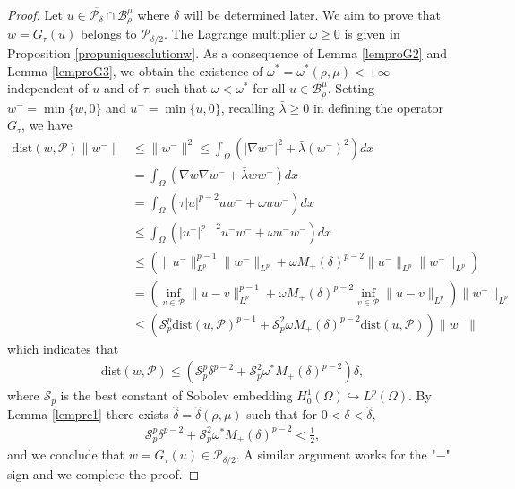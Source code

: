\documentclass[10pt,a4paper]{article}
\theoremstyle{definition} \theoremstyle{remark}
\numberwithin{equation}{section}
\newcommand{\B}{\mathcal{B}}
\newcommand{\p}{\mathcal{P}}
\newcommand{\la}{\lambda}
\begin{document}
\begin{proof}
	Let $u \in \overline{\p_\delta} \cap \B_\rho^\mu$ where $\delta$ will be determined later. We aim to prove that $w = G_\tau(u)$ belongs to $\p_{\delta/2}$. The Lagrange multiplier $\omega \geq 0$ is given in Proposition \ref{propuniquesolutionw}. As a consequence of Lemma \ref{lemproG2} and Lemma \ref{lemproG3}, we obtain the existence of $\omega^* = \omega^*(\rho,\mu) < +\infty$ independent of $u$ and of $\tau$, such that $\omega < \omega^*$ for all $u \in \B_\rho^\mu$. Setting $w^- = \min\{w,0\}$ and $u^- = \min\{u,0\}$, recalling $\bar\la \geq 0$ in defining the operator $G_\tau$, we have
	\begin{align*}
		\text{dist}(w,\p)\|w^-\| & \leq \|w^-\|^2 \le \int_\Omega\left( |\nabla w^-|^2 + \bar\la(w^-)^2\right) dx \\
		& = \int_\Omega \left( \nabla w \nabla w^- + \bar \la ww^-\right) dx \\
		& = \int_\Omega \left( \tau|u|^{p-2}u w^- + \omega u w^-\right) dx \\
		& \leq \int_\Omega \left( |u^-|^{p-2}u^- w^- + \omega u^- w^-\right) dx \\
		& \leq \left( \|u^-\|_{L^p}^{p-1}\|w^-\|_{L^p} + \omega M_+(\delta)^{p-2}\|u^-\|_{L^p}\|w^-\|_{L^p}\right) \\
		& = \left( \inf_{v \in \p}\|u-v\|_{L^p}^{p-1} + \omega M_+(\delta)^{p-2}\inf_{v \in \p}\|u-v\|_{L^p} \right) \|w^-\|_{L^p} \\
		& \le \left( \mathcal{S}_p^p \text{dist}(u,\p)^{p-1} + \mathcal{S}_p^2\omega M_+(\delta)^{p-2}\text{dist}(u,\p) \right) \|w^-\|
	\end{align*}
    which indicates that
    \begin{align} \label{eqdistwp}
    	\text{dist}(w,\p) \leq \left( \mathcal{S}_p^p\delta^{p-2} + \mathcal{S}_p^2\omega^* M_+(\delta)^{p-2}\right) \delta,
    \end{align}
    where $\mathcal{S}_p$ is the best constant of Sobolev embedding $H_0^1(\Omega) \hookrightarrow L^p(\Omega)$. By Lemma \ref{lempre1} there exists $\hat \delta = \hat \delta (\rho,\mu)$ such that for $0 < \delta < \hat\delta$,
    \begin{align} \label{eqconondelta}
    	\mathcal{S}_p^p\delta^{p-2} + \mathcal{S}_p^2\omega^* M_+(\delta)^{p-2} < \frac12,
    \end{align}
    and we conclude that $w = G_\tau(u) \in \p_{\delta/2}$. A similar argument works for the "$-$" sign and we complete the proof.
\end{proof}
\end{document}
